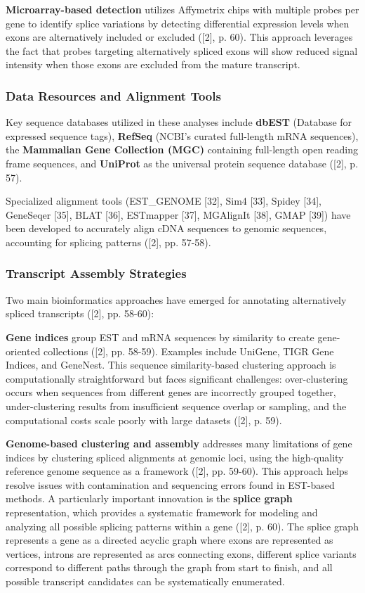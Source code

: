 \documentclass[12pt,a4paper]{article}
\begin{document}
\textbf{Microarray-based detection} utilizes Affymetrix chips with multiple probes per gene to identify splice variations by detecting differential expression levels when exons are alternatively included or excluded ([2], p. 60). This approach leverages the fact that probes targeting alternatively spliced exons will show reduced signal intensity when those exons are excluded from the mature transcript.

\subsubsection{Data Resources and Alignment Tools}

Key sequence databases utilized in these analyses include \textbf{dbEST} (Database for expressed sequence tags), \textbf{RefSeq} (NCBI's curated full-length mRNA sequences), the \textbf{Mammalian Gene Collection (MGC)} containing full-length open reading frame sequences, and \textbf{UniProt} as the universal protein sequence database ([2], p. 57).

Specialized alignment tools (EST\_GENOME [32], Sim4 [33], Spidey [34], GeneSeqer [35], BLAT [36], ESTmapper [37], MGAlignIt [38], GMAP [39]) have been developed to accurately align cDNA sequences to genomic sequences, accounting for splicing patterns ([2], pp. 57-58).

\subsubsection{Transcript Assembly Strategies}

Two main bioinformatics approaches have emerged for annotating alternatively spliced transcripts ([2], pp. 58-60):

\textbf{Gene indices} group EST and mRNA sequences by similarity to create gene-oriented collections ([2], pp. 58-59). Examples include UniGene, TIGR Gene Indices, and GeneNest. This sequence similarity-based clustering approach is computationally straightforward but faces significant challenges: over-clustering occurs when sequences from different genes are incorrectly grouped together, under-clustering results from insufficient sequence overlap or sampling, and the computational costs scale poorly with large datasets ([2], p. 59).

\textbf{Genome-based clustering and assembly} addresses many limitations of gene indices by clustering spliced alignments at genomic loci, using the high-quality reference genome sequence as a framework ([2], pp. 59-60). This approach helps resolve issues with contamination and sequencing errors found in EST-based methods. A particularly important innovation is the \textbf{splice graph} representation, which provides a systematic framework for modeling and analyzing all possible splicing patterns within a gene ([2], p. 60). The splice graph represents a gene as a directed acyclic graph where exons are represented as vertices, introns are represented as arcs connecting exons, different splice variants correspond to different paths through the graph from start to finish, and all possible transcript candidates can be systematically enumerated.
\end{document}
